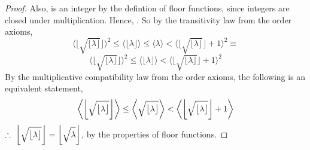 \documentclass[preview]{standalone}
\begin{document}
\begin{proof}
    Also,
    is an integer by the defintion of floor functions,
    since integers are closed under multiplication. 
    Hence,
    \bm{$
        \big \lfloor \sqrt{ \lfloor \lambda \rfloor } \big \rfloor ^2
            \leq
        \big \lfloor \lambda \big \rfloor
    $}.
    So by the transitivity law from the order axioms,
    \begin{equation*}
        \bigg \langle 
            \bigg \lfloor 
                \sqrt{ 
                    \big \lfloor \lambda \big \rfloor
                }
            \bigg \rfloor
        \bigg \rangle
            ^2
            \leq
        \bigg \langle
            \big \lfloor \lambda \big \rfloor
        \bigg \rangle
            \leq
        \bigg \langle
            \lambda
        \bigg \rangle
            <
        \bigg \langle 
            \bigg \lfloor 
                \sqrt{ 
                    \big \lfloor \lambda \big \rfloor
                }
            \bigg \rfloor
                +
            1
        \bigg \rangle
            ^2
            \equiv
    \end{equation*}
    \begin{equation*}
        \bigg \langle 
            \bigg \lfloor 
                \sqrt{ 
                    \big \lfloor \lambda \big \rfloor
                }
            \bigg \rfloor
        \bigg \rangle
            ^2
            \leq
        \bigg \langle
            \big \lfloor \lambda \big \rfloor
        \bigg \rangle
            <
        \bigg \langle 
            \bigg \lfloor 
                \sqrt{ 
                    \big \lfloor \lambda \big \rfloor
                }
            \bigg \rfloor
                +
            1
        \bigg \rangle
            ^2
    \end{equation*}
    By the multiplicative compatibility law from the order axioms,
    the following is an equivalent statement,
    \begin{equation*}
        \bigg \langle 
            \bigg \lfloor 
                \sqrt{ 
                    \big \lfloor \lambda \big \rfloor
                }
            \bigg \rfloor
        \bigg \rangle
            \leq
        \bigg \langle
            \sqrt{ \strut \big \lfloor \lambda \big \rfloor }
        \bigg \rangle
            <
        \bigg \langle 
            \bigg \lfloor 
                \sqrt{ 
                    \big \lfloor \lambda \big \rfloor
                }
            \bigg \rfloor
                +
            1
        \bigg \rangle
    \end{equation*}
    $\therefore \text{\space} \relax{
        \bigg \lfloor 
            \sqrt{ \strut \big \lfloor \lambda \big \rfloor } 
        \bigg \rfloor 
            = 
        \bigg \lfloor \sqrt{ \strut \lambda} \bigg \rfloor
    }$, by the properties of floor functions.
\end{proof}
\end{document}
